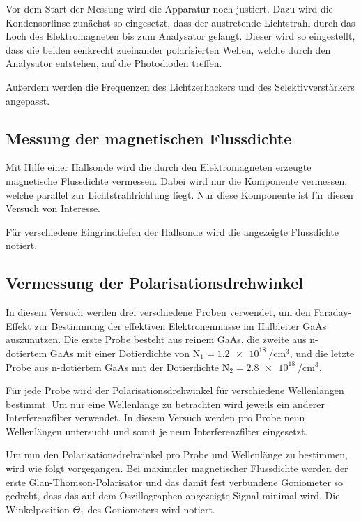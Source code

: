 Vor dem Start der Messung wird die Apparatur noch justiert. 
Dazu wird die Kondensorlinse zunächst so eingesetzt, dass der 
austretende Lichtstrahl durch das Loch des Elektromagneten 
bis zum Analysator gelangt. Dieser wird so eingestellt, dass 
die beiden senkrecht zueinander polarisierten Wellen, welche 
durch den Analysator entstehen, auf die Photodioden treffen.

Außerdem werden die Frequenzen des Lichtzerhackers und 
des Selektivverstärkers angepasst. 

%
\subsection{Messung der magnetischen Flussdichte}
%

Mit Hilfe einer Hallsonde wird die durch den Elektromagneten 
erzeugte magnetische Flussdichte vermessen. Dabei wird 
nur die Komponente vermessen, welche parallel zur 
Lichtstrahlrichtung liegt. Nur diese Komponente ist 
für diesen Versuch von Interesse. 

Für verschiedene Eingrindtiefen der Hallsonde wird die 
angezeigte Flussdichte notiert.

%
\subsection{Vermessung der Polarisationsdrehwinkel}
%

In diesem Versuch werden drei verschiedene Proben 
verwendet, um den Faraday-Effekt zur Bestimmung der 
effektiven Elektronenmasse im Halbleiter GaAs auszunutzen. 
Die erste Probe besteht aus reinem GaAs, die zweite  aus 
n-dotiertem GaAs mit einer Dotierdichte von 
$\text{N}_1 =\SI{1.2e18}{\per\centi\metre^3}$, und 
die letzte Probe aus n-dotiertem GaAs mit der 
Dotierdichte 
$\text{N}_2 =\SI{2.8e18}{\per\centi\metre^3}$.

Für jede Probe wird der Polarisationsdrehwinkel für 
verschiedene Wellenlängen bestimmt. Um nur 
eine Wellenlänge zu betrachten wird jeweils ein 
anderer Interferenzfilter verwendet. In diesem 
Versuch werden pro Probe neun Wellenlängen untersucht und 
somit je neun Interferenzfilter eingesetzt.

Um nun den Polarisationsdrehwinkel pro Probe und Wellenlänge 
zu bestimmen, wird wie folgt vorgegangen. 
Bei maximaler magnetischer Flussdichte werden der erste 
Glan-Thomson-Polarisator und das damit fest verbundene 
Goniometer so gedreht, dass das auf dem Oszillographen angezeigte 
Signal minimal wird. Die Winkelposition $\Theta_1$ des Goniometers 
wird notiert.

